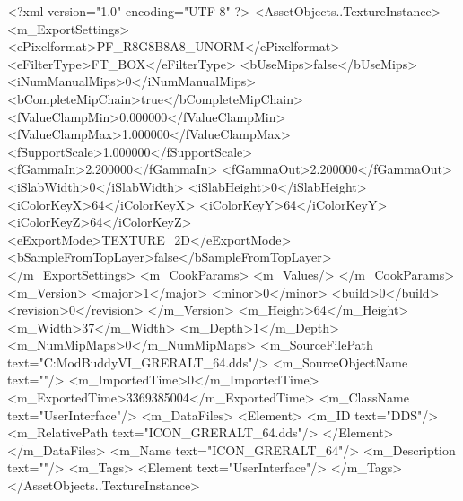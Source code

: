 <?xml version="1.0" encoding="UTF-8" ?>
<AssetObjects..TextureInstance>
	<m_ExportSettings>
		<ePixelformat>PF_R8G8B8A8_UNORM</ePixelformat>
		<eFilterType>FT_BOX</eFilterType>
		<bUseMips>false</bUseMips>
		<iNumManualMips>0</iNumManualMips>
		<bCompleteMipChain>true</bCompleteMipChain>
		<fValueClampMin>0.000000</fValueClampMin>
		<fValueClampMax>1.000000</fValueClampMax>
		<fSupportScale>1.000000</fSupportScale>
		<fGammaIn>2.200000</fGammaIn>
		<fGammaOut>2.200000</fGammaOut>
		<iSlabWidth>0</iSlabWidth>
		<iSlabHeight>0</iSlabHeight>
		<iColorKeyX>64</iColorKeyX>
		<iColorKeyY>64</iColorKeyY>
		<iColorKeyZ>64</iColorKeyZ>
		<eExportMode>TEXTURE_2D</eExportMode>
		<bSampleFromTopLayer>false</bSampleFromTopLayer>
	</m_ExportSettings>
	<m_CookParams>
		<m_Values/>
	</m_CookParams>
	<m_Version>
		<major>1</major>
		<minor>0</minor>
		<build>0</build>
		<revision>0</revision>
	</m_Version>
	<m_Height>64</m_Height>
	<m_Width>37</m_Width>
	<m_Depth>1</m_Depth>
	<m_NumMipMaps>0</m_NumMipMaps>
	<m_SourceFilePath text="C:\Users\asus\Documents\Firaxis ModBuddy\Civilization VI\temppic\ICON_GRERALT_64.dds"/>
	<m_SourceObjectName text=""/>
	<m_ImportedTime>0</m_ImportedTime>
	<m_ExportedTime>3369385004</m_ExportedTime>
	<m_ClassName text="UserInterface"/>
	<m_DataFiles>
		<Element>
			<m_ID text="DDS"/>
			<m_RelativePath text="ICON_GRERALT_64.dds"/>
		</Element>
	</m_DataFiles>
	<m_Name text="ICON_GRERALT_64"/>
	<m_Description text=""/>
	<m_Tags>
		<Element text="UserInterface"/>
	</m_Tags>
</AssetObjects..TextureInstance>

